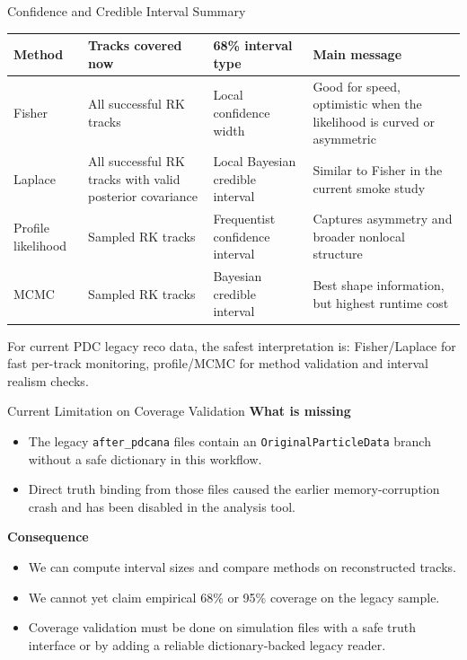 \documentclass[aspectratio=169]{beamer}
\begin{document}
\begin{frame}{Confidence and Credible Interval Summary}
\small
\begin{table}
\centering
\begin{tabular}{p{}p{}p{}p{}}
\toprule
Method & Tracks covered now & 68\% interval type & Main message \\
\midrule
Fisher & All successful RK tracks & Local confidence width & Good for speed, optimistic when the likelihood is curved or asymmetric \\
Laplace & All successful RK tracks with valid posterior covariance & Local Bayesian credible interval & Similar to Fisher in the current smoke study \\
Profile likelihood & Sampled RK tracks & Frequentist confidence interval & Captures asymmetry and broader nonlocal structure \\
MCMC & Sampled RK tracks & Bayesian credible interval & Best shape information, but highest runtime cost \\
\bottomrule
\end{tabular}
\end{table}

\vspace{0.1cm}
For current PDC legacy reco data, the safest interpretation is: Fisher/Laplace for fast per-track monitoring, profile/MCMC for method validation and interval realism checks.
\end{frame}

\begin{frame}{Current Limitation on Coverage Validation}
\small
\textbf{What is missing}
\begin{itemize}
\item The legacy \texttt{after\_pdcana} files contain an \texttt{OriginalParticleData} branch without a safe dictionary in this workflow.
\item Direct truth binding from those files caused the earlier memory-corruption crash and has been disabled in the analysis tool.
\end{itemize}

\vspace{0.2cm}
\textbf{Consequence}
\begin{itemize}
\item We can compute interval sizes and compare methods on reconstructed tracks.
\item We cannot yet claim empirical 68\% or 95\% coverage on the legacy sample.
\item Coverage validation must be done on simulation files with a safe truth interface or by adding a reliable dictionary-backed legacy reader.
\end{itemize}
\end{frame}
\end{document}
